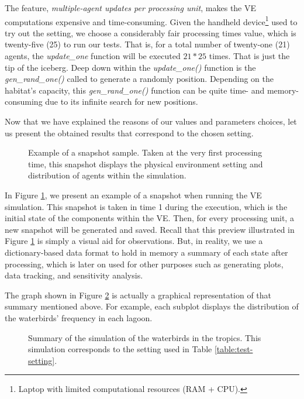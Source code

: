 The feature, \emph{multiple-agent updates per processing unit}, makes the VE computations expensive and time-consuming. Given the handheld device\footnote{Laptop with limited computational resources (RAM + CPU).} used to try out the setting, we choose a considerably fair processing times value, which is twenty-five (25) to run our tests. That is, for a total number of twenty-one (21) agents, the \emph{update\_one} function will be executed $21 * 25$ times. That is just the tip of the iceberg. Deep down within the \emph{update\_one()} function is the \emph{gen\_rand\_one()} called to generate a randomly  position. Depending on the habitat's capacity, this \emph{gen\_rand\_one()} function can be quite time- and memory-consuming due to its infinite search for new positions.


Now that we have explained the reasons of our values and parameters choices, let us present the obtained results that correspond to the chosen setting.
\begin{figure}[!ht]
    \centering
    \caption{Example of a snapshot sample. Taken at the very first processing time, this snapshot displays the physical environment setting and distribution of agents within the simulation.}
    \label{fig:snapshot-sample}
\end{figure}

In Figure \ref{fig:snapshot-sample}, we present an example of a snapshot when running the VE simulation. This snapshot is taken in time 1 during the execution, which is the initial state of the components within the VE. Then, for every processing unit, a new snapshot will be generated and saved. Recall that this preview illustrated in Figure \ref{fig:snapshot-sample} is simply a visual aid for observations. But, in reality, we use a dictionary-based data format to hold in memory a summary of each state after processing, which is later on used for other purposes such as generating plots, data tracking, and sensitivity analysis.

The graph shown in Figure \ref{fig:graph-distribution} is actually a graphical representation of that summary mentioned above. For example, each subplot displays the distribution of the waterbirds' frequency in each lagoon.
\begin{figure}[!ht]
    \centering
    \caption{Summary of the simulation of the waterbirds in the tropics. This simulation corresponds to the setting used in Table \ref{table:test-setting}.}
    \label{fig:graph-distribution}
\end{figure}

